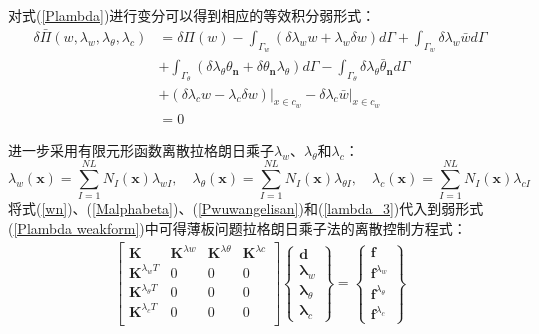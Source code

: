 对式(\ref{Plambda})进行变分可以得到相应的等效积分弱形式：
\begin{equation}\label{Plambda weakform}
\begin{split}
    \delta\bar{\Pi}(w,\lambda_w,\lambda_{\theta},\lambda_c)&=\delta\Pi(w)-\int_{\Gamma_w}(\delta\lambda_w w+\lambda_w\delta w)d\Gamma+\int_{\Gamma_w}\delta\lambda_w\bar{w}d\Gamma\\
&+\int_{\Gamma_{\theta}}(\delta\lambda_{\theta}\theta_{\pmb n}+\delta\theta_{\pmb n}\lambda_{\theta})d\Gamma-\int_{\Gamma_{\theta}}\delta\lambda_{\theta}\bar{\theta}_{\pmb n}d\Gamma\\
&+(\delta\lambda_c w-\lambda_c\delta w)\vert_{x\in c_w}-\delta\lambda_c\bar{w}\vert_{x\in c_w}\\
&=0
\end{split}
\end{equation}\par
进一步采用有限元形函数离散拉格朗日乘子$\lambda_w$、$\lambda_\theta$和$\lambda_c$：
\begin{equation}\label{lambda_3}
\lambda_w(\pmb{x})=\sum_{I=1}^{N\!L}N_I(\pmb{x})\lambda_{wI},\quad
\lambda_\theta(\pmb{x})=\sum_{I=1}^{N\!L}N_I(\pmb{x})\lambda_{\theta I},\quad
\lambda_c(\pmb{x})=\sum_{I=1}^{N\!L}N_I(\pmb{x})\lambda_{cI}
\end{equation}
将式(\ref{wn})、(\ref{Malphabeta})、(\ref{Pwuwangelisan})和(\ref{lambda_3})代入到弱形式(\ref{Plambda weakform})中可得薄板问题拉格朗日乘子法的离散控制方程式：
\begin{equation}
    \begin{split}
     \left[\begin{matrix}\pmb{K}&\pmb{K}^{\lambda w}&\pmb{K}^{\lambda\theta}&\pmb{K}^{\lambda c}\\
     \pmb{K}^{\lambda_wT}&0&0&0\\
     \pmb{K}^{\lambda_\theta T}&0&0&0\\
     \pmb{K}^{\lambda_c T}&0&0&0\\
     \end{matrix}\right]
     \left\{\begin{matrix}
     \pmb{d}\\\pmb \lambda_w\\\pmb \lambda_{\theta}\\\pmb\lambda_c
     \end{matrix}\right\}=
     \left\{\begin{matrix}
     \pmb{f}\\\pmb f^{\lambda_w}\\\pmb f^{\lambda_\theta}\\\pmb f^{\lambda_c}
     \end{matrix}\right\}
\end{split}
\end{equation}
